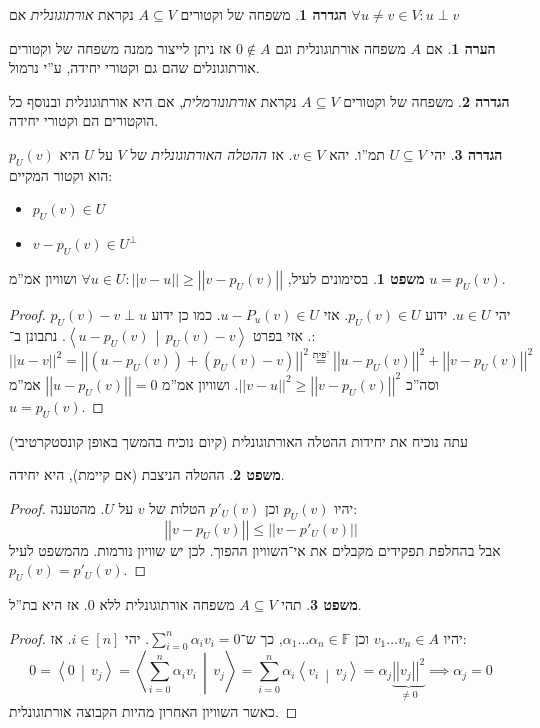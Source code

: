 \documentclass[a4paper]{article}
\newcommand\ra    {\rangle}
\newcommand\la    {\langle}
\newcommand\sumni     {\sum_{i = 0}^{n}}
\newcommand\F         {\mathbb{F}}
\newcommand\co        {\colon}
\newcommand\norm[1]   {\left \vert \left \vert #1 \right \vert \right \vert}
\newcommand\mut [2]   {\left \la #1 \,\middle\vert\, #2 \right \ra}
\newcommand\ag        {\alpha}
\theoremstyle{definition}
\newtheorem{Theorem}{משפט}
\newtheorem{definition}{הגדרה}
\newtheorem{Remark}{הערה}
\newcommand\theo  [1] {\begin{Theorem}#1\end{Theorem}}
\newcommand\defi  [1] {\begin{definition}#1\end{definition}}
\newcommand\rmark [1] {\begin{Remark}#1\end{Remark}}
\begin{document}
	\defi{משפחה של וקטורים $A \subseteq V$ נקראת \textit{אורתוגונלית} אם $\forall u \neq v \in V\co u \perp v$}
	\rmark{אם $A$ משפחה אורתוגונלית וגם $0 \notin A$ אז ניתן לייצור ממנה משפחה של וקטורים אורתוגונלים שהם גם וקטורי יחידה, ע''י נרמול. }
	\defi{משפחה של וקטורים $A \subseteq V$ נקראת \textit{אורתונורמלית}, אם היא אורתוגונלית ובנוסף כל הוקטורים הם וקטורי יחידה. }
	
	\defi{יהי $U \subseteq V$ תמ''ו. יהא $v \in V$. אז \textit{ההטלה האורתוגונלית} של $V$ על $U$ היא $p_U(v)$ הוא וקטור המקיים: 
		\begin{itemize}
			\item \hfil $p_U(v) \in U$ 
			\item \hfil $v - p_U(v) \in U^\perp$
	\end{itemize}}
	\theo{בסימונים לעיל, $\forall u \in U \co \norm{v - u} \ge \norm{v - p_U(v)}$ ושוויון אמ''מ $u = p_U(v)$. }
	
	\begin{proof}
		יהי $u \in U$. ידוע $p_U(v) \in U$. אזי $u - P_u(v) \in U$. כמו כן ידוע $p_U(v) - v \perp u$. אזי בפרט $\mut{u - p_U(v)}{p_U(v) - v}$. נתבונן ב־: 
		\[ \norm{u - v}^2 = \norm{(u - p_U(v)) + (p_U(v) - v)}^2 \overset{\text{פית'}}{=} \norm{u - p_U(v)}^2 + \norm{v - p_U(v)}^2 \]
		וסה''כ $\norm{v - u}^2 \ge \norm{v - p_U(v)}^2$. ושוויון אמ''מ $\norm{u- p_U(v)} = 0$ אמ''מ $u  = p_U(v)$. 
	\end{proof}
	עתה נוכיח את יחידות ההטלה האורתוגונלית (קיום נוכיח בהמשך באופן קונסטקרטיבי)
	\theo{ההטלה הניצבת (אם קיימת), היא יחידה. }\begin{proof}
		יהיו $p_U(v)$ וכן $p'_U(v)$ הטלות של $v$ על $U$. מהטענה: 
		\[ \norm{v - p_U(v)} \le \norm{v - p'_U(v)} \]
		אבל בהחלפת תפקידים מקבלים את אי־השוויון ההפוך. לכן יש שוויון נורמות. מהמשפט לעיל $p_U(v) = p'_U(v)$. 
	\end{proof}
	
	\theo{תהי $A \subseteq V$ משפחה אורתוגונלית ללא $0$. אז היא בת''ל. }\begin{proof}
		יהיו $v_1 \dots v_n \in A$ וכן $\ag_1 \dots \ag_n \in \F$, כך ש־$\sumni \ag_i v_i = 0$. יהי $i \in [n]$. אז: 
		\[ 0 = \mut{0}{v_j} = \mut{\sumni \ag_i v_i}{v_j} = \sumni \ag_i \mut{v_i}{v_j} = \ag _j \underbrace{\norm{v_j}^2}_{\neq 0} \implies \ag_j = 0 \]
		כאשר השוויון האחרון מהיות הקבוצה אורתוגונלית. 
	\end{proof}
	
\end{document}

